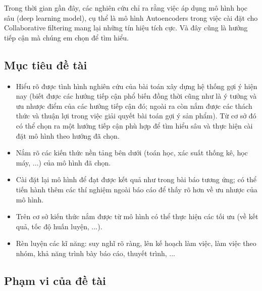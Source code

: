\documentclass{article}[14pt]
\begin{document}
{    %
    Trong thời gian gần đây, các nghiên cứu chỉ ra rằng việc áp dụng mô hình 
    học sâu (deep learning model), cụ thể là mô hình Autoencoders trong việc 
    cài đặt cho Collaborative filtering mang lại những tín hiệu tích cực. 
    Và đây cũng là hướng tiếp cận mà chúng em chọn để tìm hiểu.
  
      \subsection{Mục tiêu đề tài}
      
  \begin{itemize}
  \item     Hiểu rõ được tình hình nghiên cứu của bài toán xây dựng hệ thống gợi ý
   hiện nay (biết được các hướng tiếp cận phổ biến đồng thời cũng như là ý tưởng 
   và ưu nhược điểm của các hướng tiếp cận đó; ngoài ra còn nắm được các 
   thách thức và thuận lợi trong việc giải quyết bài toán gợi ý sản phẩm). Từ cơ 
   sở đó có thể chọn ra một hướng tiếp cận phù hợp để tìm hiểu sâu và thực hiện 
   cài đặt mô hình theo hướng đã chọn.
  \item      Nắm rõ các kiến thức nền tảng bên dưới (toán học, xác suất thống kê, 
  học máy, ...) của mô hình đã chọn.
  \item     Cài đặt lại mô hình  để đạt được kết quả như trong bài báo tương ứng; 
  có thể tiến hành thêm các thí nghiệm ngoài báo cáo để thấy rõ hơn về ưu nhược 
  của mô hình.
  \item     Trên cơ sở kiến thức nắm được từ mô hình có thể thực hiện các tối ưu 
  (về kết quả, tốc độ huấn luyện, ...).
  \item     Rèn luyện các kĩ năng: suy nghĩ rõ ràng, lên kế hoạch làm việc, 
  làm việc theo nhóm, khả năng trình bày báo cáo, thuyết trình, ...
  \end{itemize}

    
    \subsection{Phạm vi của đề tài}
    
}
\end{document}
